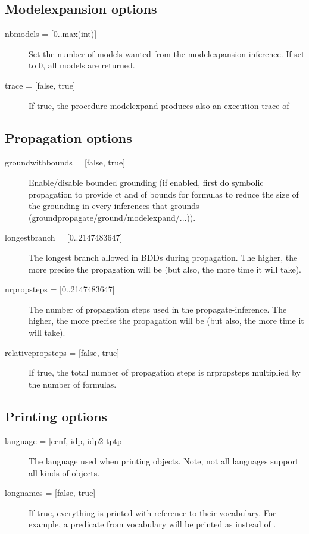 \subsection{Modelexpansion options}
\begin{description}
	\item[{nbmodels = [0..max(int)]}] Set the number of models wanted from the modelexpansion inference.  If set to 0, all models are returned.
	\item[{trace = [false, true]}] If true, the procedure modelexpand produces also an execution trace of \minisatid 
\end{description}

\subsection{Propagation options}
\begin{description}
	\item[{groundwithbounds = [false, true]}] Enable/disable bounded grounding (if enabled, first do symbolic propagation to provide ct and cf bounds for formulas to reduce the size of the grounding in every inferences that grounds (groundpropagate/ground/modelexpand/...)).
	\item[{longestbranch = [0..2147483647]}] The longest branch allowed in BDDs during propagation. The higher, the more precise the propagation will be (but also, the more time it will take).
	\item[{nrpropsteps = [0..2147483647]}] The number of propagation steps used in the propagate-inference. The higher, the more precise the propagation will be (but also, the more time it will take).
	\item[{relativepropsteps =  [false, true]}] If true, the total number of propagation steps is nrpropsteps multiplied by the number of formulas.
\end{description}

\subsection{Printing options}
\begin{description}
	\item[{language = [ecnf, idp, idp2 %
				tptp]}] The language used when printing objects. Note, not all languages support all kinds of objects.
	\item[{longnames = [false, true]}] If true, everything is printed with reference to their vocabulary.  For example, a predicate  from vocabulary  will be printed as  instead of .
\end{description}

